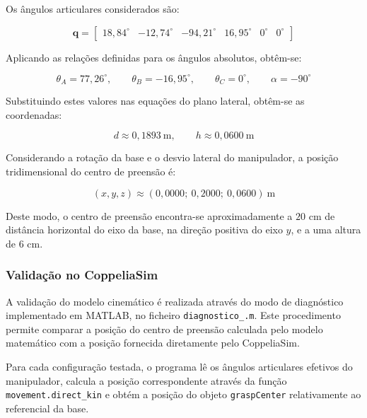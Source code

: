 Os ângulos articulares considerados são:

\begin{equation}
    \mathbf{q}=
    \begin{bmatrix}
    18{,}84^\circ &
    -12{,}74^\circ &
    -94{,}21^\circ &
    16{,}95^\circ &
    0^\circ &
    0^\circ
    \end{bmatrix}
    \label{eq:q_trabalho}
\end{equation}

Aplicando as relações definidas para os ângulos absolutos, obtêm-se:

\begin{equation}
    \theta_A=77{,}26^\circ,\qquad
    \theta_B=-16{,}95^\circ,\qquad
    \theta_C=0^\circ,\qquad
    \alpha=-90^\circ
\end{equation}

Substituindo estes valores nas equações do plano lateral, obtêm-se as coordenadas:

\begin{equation}
    d\approx0{,}1893\ \text{m},\qquad
    h\approx0{,}0600\ \text{m}
\end{equation}

Considerando a rotação da base e o desvio lateral do manipulador, a posição tridimensional do centro de preensão é:

\begin{equation}
    (x,y,z)\approx
    (0{,}0000;\ 0{,}2000;\ 0{,}0600)
    \ \text{m}
\end{equation}

Deste modo, o centro de preensão encontra-se aproximadamente a $20$ cm de distância horizontal do eixo da base, na direção positiva do eixo $y$, e a uma altura de $6$ cm.


\subsubsection{Validação no CoppeliaSim}

A validação do modelo cinemático é realizada através do modo de diagnóstico implementado em MATLAB, no ficheiro \texttt{diagnostico\_.m}. Este procedimento permite comparar a posição do centro de preensão calculada pelo modelo matemático com a posição fornecida diretamente pelo CoppeliaSim.

Para cada configuração testada, o programa lê os ângulos articulares efetivos do manipulador, calcula a posição correspondente através da função \texttt{movement.direct\_kin} e obtém a posição do objeto \texttt{graspCenter} relativamente ao referencial da base.

